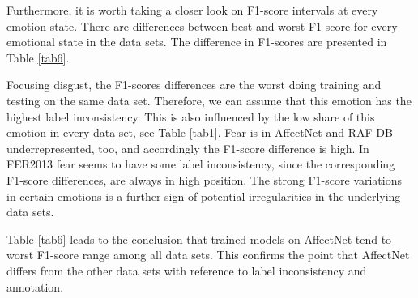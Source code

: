 \documentclass[a4paper, conference]{IEEEtran}
\begin{document}

Furthermore, it is worth taking a closer look on F1-score intervals at every emotion state. There are differences between best and worst F1-score for every emotional state in the data sets. The difference in F1-scores are presented in Table \ref{tab6}.

Focusing disgust, the F1-scores differences are the worst doing training and testing on the same data set. Therefore, we can assume that this emotion has the highest label inconsistency. This is also influenced by the low share of this emotion in every data set, see Table \ref{tab1}. Fear is in AffectNet and RAF-DB underrepresented, too, and accordingly the F1-score difference is high. In FER2013 fear seems to have some label inconsistency, since the corresponding F1-score differences, are always in high position. The strong F1-score variations in certain emotions is a further sign of potential irregularities in the underlying data sets.

Table \ref{tab6} leads to the conclusion that trained models on AffectNet tend to worst F1-score range among all data sets. This confirms the point that AffectNet differs from the other data sets with reference to label inconsistency and annotation.
\end{document}
